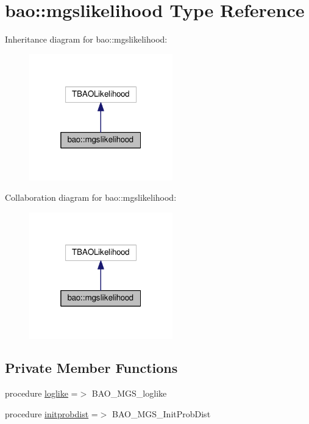 \hypertarget{structbao_1_1mgslikelihood}{}\section{bao\+:\+:mgslikelihood Type Reference}
\label{structbao_1_1mgslikelihood}


Inheritance diagram for bao\+:\+:mgslikelihood\+:
\nopagebreak
\begin{figure}[H]
\begin{center}
\leavevmode
\includegraphics[width=176pt]{structbao_1_1mgslikelihood__inherit__graph}
\end{center}
\end{figure}


Collaboration diagram for bao\+:\+:mgslikelihood\+:
\nopagebreak
\begin{figure}[H]
\begin{center}
\leavevmode
\includegraphics[width=176pt]{structbao_1_1mgslikelihood__coll__graph}
\end{center}
\end{figure}
\subsection*{Private Member Functions}
\begin{DoxyCompactItemize}
\item 
procedure \mbox{\hyperlink{structbao_1_1mgslikelihood_ad5a6fafb8449b5861a24eb9d3382510e}{loglike}} =$>$ B\+A\+O\+\_\+\+M\+G\+S\+\_\+loglike
\item 
procedure \mbox{\hyperlink{structbao_1_1mgslikelihood_a53b7049278f2fd93e079b973bbeb4d22}{initprobdist}} =$>$ B\+A\+O\+\_\+\+M\+G\+S\+\_\+\+Init\+Prob\+Dist
\end{DoxyCompactItemize}

